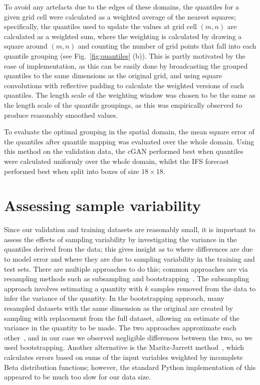 \documentclass[../main.tex]{subfiles}
\begin{document}
To avoid any artefacts due to the edges of these domains, the quantiles for a given grid cell were calculated as a weighted average of the nearest squares; specifically, the quantiles used to update the values at grid cell $(m,n)$ are calculated as a weighted sum, where the weighting is calculated by drawing a square around $(m,n)$ and counting the number of grid points that fall into each quantile grouping (see Fig.~\ref{fig:quantiles} (b)). This is partly motivated by the ease of implementation, as this can be easily done by broadcasting the grouped quantiles to the same dimensions as the original grid, and using square convolutions with reflective padding to calculate the weighted versions of each quantiles. The length scale of the weighting window was chosen to be the same as the length scale of the quantile groupings, as this was empirically observed to produce reasonably smoothed values.

To evaluate the optimal grouping in the spatial domain, the mean square error of the quantiles after quantile mapping was evaluated over the whole domain. Using this method on the validation data, the cGAN performed best when quantiles were calculated uniformly over the whole domain, whilst the IFS forecast performed best when split into boxes of size $18 \times 18$. 


 
\section{Assessing sample variability}
\label{sec:sample_var}
Since our validation and training datasets are reasonably small, it is important to assess the effects of sampling variability by investigating the variance in the quantiles derived from the data; this gives insight as to where differences are due to model error and where they are due to sampling variability in the training and test sets. There are multiple approaches to do this; common approaches are via resampling methods such as subsampling and bootstrapping~\citep{efron_6_1982}. The subsampling approach involves estimating a quantity with $k$ samples removed from the data to infer the variance of the quantity. In the bootstrapping approach, many resampled datasets with the same dimension as the original are created by sampling with replacement from the full dataset, allowing an estimate of the variance in the quantity to be made. The two approaches approximate each other~\citep{efron_6_1982}, and in our case we observed negligible differences between the two, so we used bootstrapping. Another alternative is the Maritz-Jarrett method~\citep{wilcox_chapter_2022}, which calculates errors based on sums of the input variables weighted by incomplete Beta distribution functions; however, the standard Python implementation of this appeared to be much too slow for our data size.


     
\ifSubfilesClassLoaded{%
    
    

}{}
\end{document}
